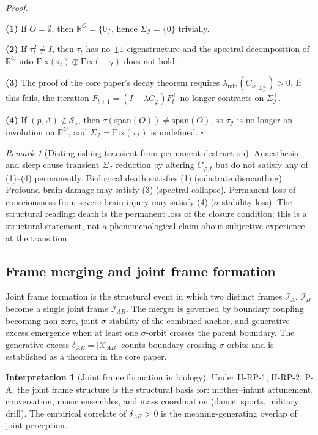 \documentclass[11pt]{article}
\theoremstyle{plain}
\theoremstyle{definition}
\newtheorem{interpretation}[theorem]{Interpretation}
\theoremstyle{remark}
\newtheorem{remark}[theorem]{Remark}
\newcommand{\Fix}{\mathrm{Fix}}
\newcommand{\Ical}{\mathcal{I}}
\newcommand{\Cph}{C_\varphi}
\newcommand{\Xcal}{\mathcal{X}}
\begin{document}
\noindent\emph{Proof.}

\textbf{(1)} If $O = \emptyset$, then $\mathbb{R}^O = \{0\}$, hence $\Sigma_\Ical = \{0\}$ trivially.

\textbf{(2)} If $\tau_t^2 \neq I$, then $\tau_t$ has no $\pm 1$ eigenstructure and the spectral decomposition of $\mathbb{R}^O$ into $\Fix(\tau_t) \oplus \Fix(-\tau_t)$ does not hold.

\textbf{(3)} The proof of the core paper's decay theorem requires $\lambda_{\min}(\Cph|_{\Sigma_\Ical^\perp}) > 0$. If this fails, the iteration $F^\perp_{t+1} = (I - \lambda \Cph) F^\perp_t$ no longer contracts on $\Sigma_\Ical^\perp$.

\textbf{(4)} If $(p, \Lambda) \notin \mathcal{S}_\sigma$, then $\tau(\mathrm{span}(O)) \neq \mathrm{span}(O)$, so $\tau_\Ical$ is no longer an involution on $\mathbb{R}^O$, and $\Sigma_\Ical = \Fix(\tau_\Ical)$ is undefined. \hfill$\square$

\begin{remark}[Distinguishing transient from permanent destruction]\label{rem:destruction-criterion}
Anaesthesia and sleep cause transient $\Sigma_\Ical$ reduction by altering $C_{\varphi,t}$ but do not satisfy any of (1)--(4) permanently. Biological death satisfies (1) (substrate dismantling). Profound brain damage may satisfy (3) (spectral collapse). Permanent loss of consciousness from severe brain injury may satisfy (4) ($\sigma$-stability loss). The structural reading: death is the permanent loss of the closure condition; this is a structural statement, not a phenomenological claim about subjective experience at the transition.
\end{remark}

\subsection{Frame merging and joint frame formation}

Joint frame formation is the structural event in which two distinct frames $\Ical_A$, $\Ical_B$ become a single joint frame $\Ical_{AB}$. The merger is governed by boundary coupling becoming non-zero, joint $\sigma$-stability of the combined anchor, and generative excess emergence when at least one $\sigma$-orbit crosses the parent boundary. The generative excess $\delta_{AB} = |\Xcal_{AB}|$ counts boundary-crossing $\sigma$-orbits and is established as a theorem in the core paper.

\begin{interpretation}[Joint frame formation in biology]\label{int:joint-formation}
Under H-RP-1, H-RP-2, P-A, the joint frame structure is the structural basis for: mother--infant attunement, conversation, music ensembles, and mass coordination (dance, sports, military drill). The empirical correlate of $\delta_{AB} > 0$ is the meaning-generating overlap of joint perception.
\end{interpretation}
\end{document}
